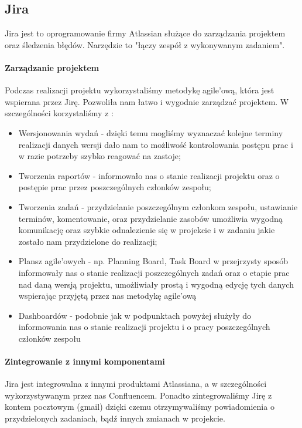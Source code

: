 \documentclass[licencjacka]{pracamgr}
\begin{document}
\subsection{Jira}
Jira jest to oprogramowanie firmy Atlassian służące do zarządzania projektem oraz śledzenia błędów. 
Narzędzie to "łączy zespół z wykonywanym zadaniem".

\paragraph{Zarządzanie projektem} 
Podczas realizacji projektu wykorzystaliśmy metodykę agile'ową, która jest wspierana przez Jirę. 
Pozwoliła nam łatwo i wygodnie zarządzać projektem. W szczególności korzystaliśmy z :
\begin{itemize}
\item Wersjonowania wydań - dzięki temu mogliśmy wyznaczać kolejne terminy realizacji danych wersji 
  dało nam to możliwość kontrolowania postępu prac i w razie potrzeby szybko reagować na zastoje;
\item Tworzenia raportów - informowało nas o stanie realizacji projektu oraz o postępie prac przez poszczególnych członków zespołu;
\item Tworzenia zadań - przydzielanie poszczególnym członkom zespołu, ustawianie terminów, komentowanie, oraz przydzielanie zasobów 
umożliwia wygodną komunikację oraz szybkie odnalezienie się w projekcie i w zadaniu jakie zostało nam przydzielone do realizacji;
\item Plansz agile'owych - np. Planning Board, Task Board w przejrzysty sposób informowały nas o stanie realizacji poszczególnych zadań oraz o 
etapie prac nad daną wersją projektu, umożliwiały prostą i wygodną edycję tych danych wspierając przyjętą przez nas metodykę agile'ową
\item Dashboardów - podobnie jak w podpunktach powyżej służyły do informowania nas o stanie realizacji projektu i o pracy poszczególnych członków zespołu
\end{itemize}

\paragraph{Zintegrowanie z innymi komponentami}
Jira jest integrowalna z innymi produktami Atlassiana, a w szczególności wykorzystywanym przez nas Confluencem.
Ponadto zintegrowaliśmy Jirę z kontem pocztowym (gmail) dzięki czemu otrzymywaliśmy powiadomienia o przydzielonych zadaniach, bądź innych zmianach w projekcie.
\end{document}
